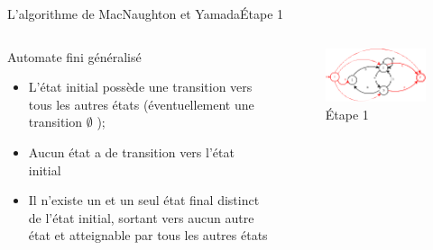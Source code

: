 \documentclass{beamer}
\begin{document}
\begin{frame}{L'algorithme de MacNaughton et Yamada}{Étape 1}
     \begin{columns}[T]
     \begin{column}{.48\textwidth}
         {\fontsize{8}{9}\selectfont Automate fini généralisé}
         \begin{itemize}
         
             \item {\fontsize{7}{8}\selectfont L'état initial possède une transition vers tous les autres états (éventuellement une transition $\emptyset$ );}
             \item {\fontsize{7}{8}\selectfont Aucun état a de transition vers l'état initial}
             \item {\fontsize{7}{8}\selectfont Il n'existe un et un seul état final distinct de l'état initial, sortant vers aucun autre état et atteignable par tous les autres états}

         \end{itemize}
     \end{column}
     
     \begin{column}{.48\textwidth}
     \begin{figure}
     \includegraphics[scale=0.37]{Diagramme2_1.png}
     \centering
     \caption{Étape 1}     
     \end{figure}
     \end{column}
        
     \end{columns}

\end{frame}
\end{document}
